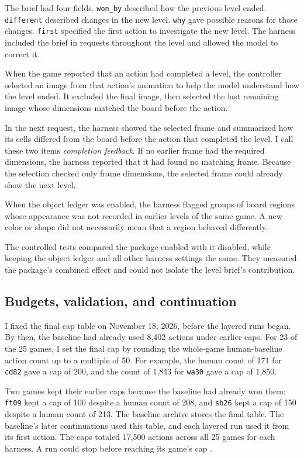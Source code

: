 The brief had four fields. \texttt{won\_by} described how the previous level ended. \texttt{different} described changes in the new level. \texttt{why} gave possible reasons for those changes. \texttt{first} specified the first action to investigate the new level. The harness included the brief in requests throughout the level and allowed the model to correct it.

When the game reported that an action had completed a level, the controller selected an image from that action's animation to help the model understand how the level ended. It excluded the final image, then selected the last remaining image whose dimensions matched the board before the action.

In the next request, the harness showed the selected frame and summarized how its cells differed from the board before the action that completed the level. I call these two items \emph{completion feedback}. If no earlier frame had the required dimensions, the harness reported that it had found no matching frame. Because the selection checked only frame dimensions, the selected frame could already show the next level.

When the object ledger was enabled, the harness flagged groups of board regions whose appearance was not recorded in earlier levels of the same game. A new color or shape did not necessarily mean that a region behaved differently.

The controlled tests compared the package enabled with it disabled, while keeping the object ledger and all other harness settings the same. They measured the package’s combined effect and could not isolate the level brief’s contribution.



\subsection{Budgets, validation, and continuation}\label{sec:continuation-design}
I fixed the final cap table on November 18, 2026, before the layered runs began. By then, the baseline had already used 8,402 actions under earlier caps. For 23 of the 25 games, I set the final cap by rounding the whole-game human-baseline action count up to a multiple of 50. For example, the human count of 171 for \texttt{cd82} gave a cap of 200, and the count of 1,843 for \texttt{wa30} gave a cap of 1,850.

Two games kept their earlier caps because the baseline had already won them: \texttt{ft09} kept a cap of 100 despite a human count of 208, and \texttt{sb26} kept a cap of 150 despite a human count of 213. The baseline archive stores the final table. The baseline's later continuations used this table, and each layered run used it from its first action. The caps totaled 17,500 actions across all 25 games for each harness. A run could stop before reaching its game's cap \citep{dai2026continuationfinal}.

